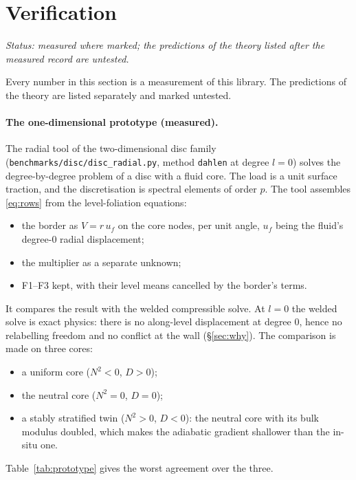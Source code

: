\documentclass[11pt]{article}
\theoremstyle{definition}
\theoremstyle{remark}
\newcommand{\code}[1]{\texttt{#1}}
\begin{document}
\section{Verification}
\label{sec:verify}
\label{sec:verification}

\emph{Status: measured where marked; the predictions of the theory
listed after the measured record are untested.}

Every number in this section is a measurement of this library. The
predictions of the theory are listed separately and marked
untested.

\paragraph{The one-dimensional prototype (measured).} The radial tool of
the two-dimensional disc family (\code{benchmarks/disc/disc\_radial.py},
method \code{dahlen} at degree $l = 0$) solves the degree-by-degree
problem of a disc with a fluid core. The load is a unit surface
traction, and the discretisation is spectral elements of order $p$.
The tool assembles \eqref{eq:rows} from the level-foliation equations:
\begin{itemize}
\item the border as $V = r\,u_f$ on the core nodes, per unit angle,
  $u_f$ being the fluid's degree-0 radial displacement;
\item the multiplier as a separate unknown;
\item F1--F3 kept, with their level means cancelled by the border's
  terms.
\end{itemize}
It compares the result with the welded compressible solve. At $l = 0$
the welded solve is exact physics: there is no along-level
displacement at degree $0$, hence no relabelling freedom and no
conflict at the wall (\S\ref{sec:why}). The comparison is made on three
cores:
\begin{itemize}
\item a uniform core ($N^2 < 0$, $D > 0$);
\item the neutral core ($N^2 = 0$, $D = 0$);
\item a stably stratified twin ($N^2 > 0$, $D < 0$): the neutral core
  with its bulk modulus doubled, which makes the adiabatic gradient
  shallower than the in-situ one.
\end{itemize}
Table~\ref{tab:prototype} gives the worst agreement over the three.
\end{document}

